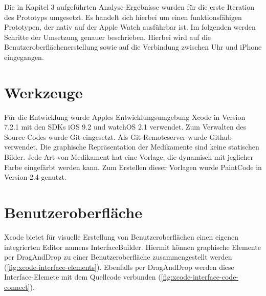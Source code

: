 
Die in Kapitel 3 aufgeführten Analyse-Ergebnisse wurden für die erste Iteration des Prototyps umgesetzt. Es handelt sich hierbei um einen funktionsfähigen Prototypen, der nativ auf der Apple Watch ausführbar ist. Im folgenden werden Schritte der Umsetzung genauer beschrieben. Hierbei wird auf die Benutzeroberflächenerstellung sowie auf die Verbindung zwischen Uhr und iPhone eingegangen.

\section{Werkzeuge}
Für die Entwicklung wurde Apples Entwicklungsumgebung Xcode in Version 7.2.1 mit den SDKs iOS 9.2 und watchOS 2.1 verwendet. Zum Verwalten des Source-Codes wurde Git\cite{git} eingesetzt. Als Git-Remoteserver wurde Github \cite{github} verwendet. Die graphische Repräsentation der Medikamente sind keine statischen Bilder. Jede Art von Medikament hat eine Vorlage, die dynamisch mit jeglicher Farbe eingefärbt werden kann. Zum Erstellen dieser Vorlagen wurde PaintCode in Version 2.4 \cite{paintCode} genutzt.

\section{Benutzeroberfläche}
Xcode bietet für visuelle Erstellung von Benutzeroberflächen einen eigenen integrierten Editor namens InterfaceBuilder. Hiermit können graphische Elemente per DragAndDrop zu einer Benutzeroberfläche zusammengestellt werden (\ref{fig:xcode-interface-elements}). Ebenfalls per DragAndDrop werden diese Interface-Elemete mit dem Quellcode verbunden (\ref{fig:xcode-interface-code-connect}).

